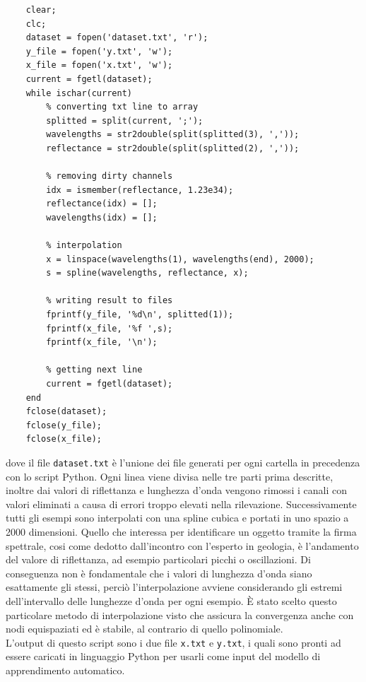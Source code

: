 \begin{lstlisting}
    clear;
    clc;
    dataset = fopen('dataset.txt', 'r');
    y_file = fopen('y.txt', 'w');
    x_file = fopen('x.txt', 'w');
    current = fgetl(dataset);
    while ischar(current)
        % converting txt line to array
        splitted = split(current, ';');
        wavelengths = str2double(split(splitted(3), ','));
        reflectance = str2double(split(splitted(2), ','));
        
        % removing dirty channels
        idx = ismember(reflectance, 1.23e34);
        reflectance(idx) = [];
        wavelengths(idx) = [];
        
        % interpolation
        x = linspace(wavelengths(1), wavelengths(end), 2000);
        s = spline(wavelengths, reflectance, x);
        
        % writing result to files
        fprintf(y_file, '%d\n', splitted(1));
        fprintf(x_file, '%f ',s);
        fprintf(x_file, '\n');
        
        % getting next line
        current = fgetl(dataset);
    end
    fclose(dataset);
    fclose(y_file);
    fclose(x_file);
\end{lstlisting}
dove il file \verb|dataset.txt| è l'unione dei file generati per ogni cartella in precedenza con lo script Python.
Ogni linea viene divisa nelle tre parti prima descritte, inoltre dai valori di riflettanza e lunghezza d'onda vengono rimossi i canali con valori eliminati a causa di errori troppo elevati nella rilevazione.
Successivamente tutti gli esempi sono interpolati con una spline cubica e portati in uno spazio a 2000 dimensioni. Quello che interessa per identificare un oggetto tramite la firma spettrale, cosi come dedotto dall'incontro con l'esperto in geologia, è l'andamento del valore di riflettanza, ad esempio particolari picchi o oscillazioni. Di conseguenza non è fondamentale che i valori di lunghezza d'onda siano esattamente gli stessi, perciò l'interpolazione avviene considerando gli estremi dell'intervallo delle lunghezze d'onda per ogni esempio. È stato scelto questo particolare metodo di interpolazione visto che assicura la convergenza anche con nodi equispaziati ed è stabile, al contrario di quello polinomiale.\\
L'output di questo script sono i due file \verb|x.txt| e \verb|y.txt|, i quali sono pronti ad essere caricati in linguaggio Python per usarli come input del modello di apprendimento automatico.

